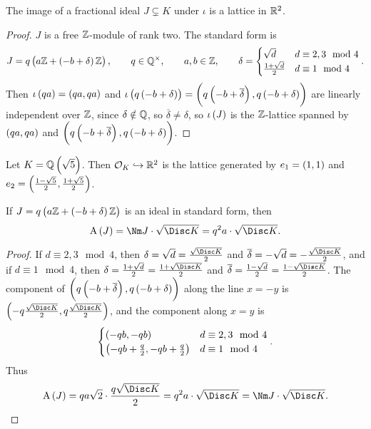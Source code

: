 \begin{lemma}
The image of a fractional ideal $ J \subsetneq K $ under $ \iota $ is a lattice in $ \mathbb{R}^2 $.
\end{lemma}

\begin{proof}
$ J $ is a free $ \mathbb{Z} $-module of rank two. The standard form is
$$ J = q\br{a\ZZ + \br{-b + \delta}\ZZ}, \qquad q \in \QQ^\times, \qquad a, b \in \ZZ, \qquad \delta =
\begin{cases}
\sqrt{d} & d \equiv 2, 3 \mod 4 \\
\tfrac{1 + \sqrt{d}}{2} & d \equiv 1 \mod 4
\end{cases}.
$$
Then $ \iota\br{qa} = \br{qa, qa} $ and $ \iota\br{q\br{-b + \delta}} = \br{q\br{-b + \overline{\delta}}, q\br{-b + \delta}} $ are linearly independent over $ \mathbb{Z} $, since $ \delta \notin \mathbb{Q} $, so $ \overline{\delta} \ne \delta $, so $ \iota\br{J} $ is the $ \mathbb{Z} $-lattice spanned by $ \br{qa, qa} $ and $ \br{q\br{-b + \overline{\delta}}, q\br{-b + \delta}} $.
\end{proof}

\begin{example*}
Let $ K = \QQ\br{\sqrt{5}} $. Then $ \mathcal{O}_K \hookrightarrow \mathbb{R}^2 $ is the lattice generated by $ e_1 = \br{1, 1} $ and $ e_2 = \br{\tfrac{1 - \sqrt{5}}{2}, \tfrac{1 + \sqrt{5}}{2}} $.
\end{example*}

\begin{proposition}
If $ J = q\br{a\ZZ + \br{-b + \delta}\ZZ} $ is an ideal in standard form, then
$$ \A\br{J} = \Nm J \cdot \sqrt{\Disc K} = q^2a \cdot \sqrt{\Disc K}. $$
\end{proposition}

\begin{proof}
If $ d \equiv 2, 3 \mod 4 $, then $ \delta = \sqrt{d} = \tfrac{\sqrt{\Disc K}}{2} $ and $ \overline{\delta} = -\sqrt{d} = -\tfrac{\sqrt{\Disc K}}{2} $, and if $ d \equiv 1 \mod 4 $, then $ \delta = \tfrac{1 + \sqrt{d}}{2} = \tfrac{1 + \sqrt{\Disc K}}{2} $ and $ \overline{\delta} = \tfrac{1 - \sqrt{d}}{2} = \tfrac{1 - \sqrt{\Disc K}}{2} $. The component of $ \br{q\br{-b + \overline{\delta}}, q\br{-b + \delta}} $ along the line $ x = -y $ is $ \br{-q\tfrac{\sqrt{\Disc K}}{2}, q\tfrac{\sqrt{\Disc K}}{2}} $, and the component along $ x = y $ is
$$
\begin{cases}
\br{-qb, -qb} & d \equiv 2, 3 \mod 4 \\
\br{-qb + \tfrac{q}{2}, -qb + \tfrac{q}{2}} & d \equiv 1 \mod 4
\end{cases}.
$$
Thus
$$ \A\br{J} = qa\sqrt{2} \cdot \dfrac{q\sqrt{\Disc K}}{2} = q^2a \cdot \sqrt{\Disc K} = \Nm J \cdot \sqrt{\Disc K}. $$
\end{proof}

